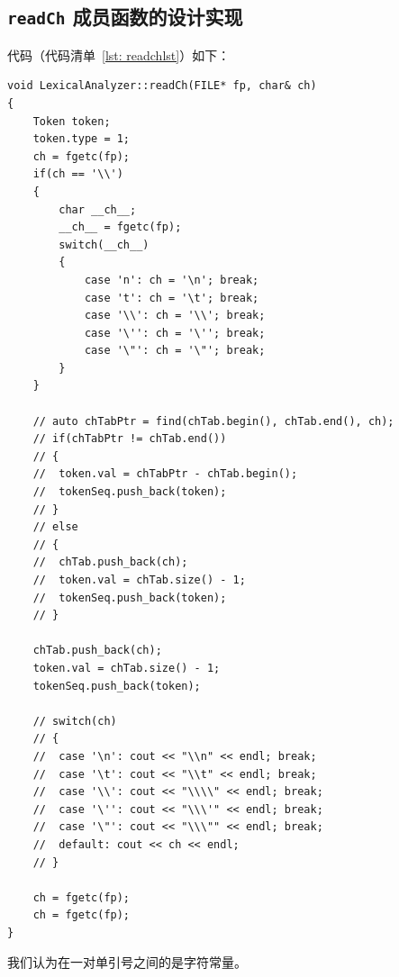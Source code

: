 \documentclass{article}
\begin{document}
\begin{CJK*}{UTF8}{gbsn}
\subsection{\texttt{readCh} 成员函数的设计实现}
代码（代码清单~\ref{lst: readchlst}）如下：
\begin{center}
\begin{lstlisting}[caption = {\texttt{readCh} 成员函数代码清单}, label = {lst: readchlst}]
void LexicalAnalyzer::readCh(FILE* fp, char& ch)
{
	Token token;
	token.type = 1;
	ch = fgetc(fp);
	if(ch == '\\')
	{
		char __ch__;
		__ch__ = fgetc(fp);
		switch(__ch__)
		{
			case 'n': ch = '\n'; break;
			case 't': ch = '\t'; break;
			case '\\': ch = '\\'; break;
			case '\'': ch = '\''; break;
			case '\"': ch = '\"'; break;
		}
	}

	// auto chTabPtr = find(chTab.begin(), chTab.end(), ch);
	// if(chTabPtr != chTab.end())
	// {
	// 	token.val = chTabPtr - chTab.begin();
	// 	tokenSeq.push_back(token);
	// }
	// else
	// {
	// 	chTab.push_back(ch);
	// 	token.val = chTab.size() - 1;
	// 	tokenSeq.push_back(token);
	// }

	chTab.push_back(ch);
	token.val = chTab.size() - 1;
	tokenSeq.push_back(token);

	// switch(ch)
	// {
	// 	case '\n': cout << "\\n" << endl; break;
	// 	case '\t': cout << "\\t" << endl; break;
	// 	case '\\': cout << "\\\\" << endl; break;
	// 	case '\'': cout << "\\\'" << endl; break;
	// 	case '\"': cout << "\\\"" << endl; break;
	// 	default: cout << ch << endl;
	// }

	ch = fgetc(fp);
	ch = fgetc(fp);
}
\end{lstlisting}
\end{center}
我们认为在一对单引号之间的是字符常量。


\end{CJK*}
\end{document}
